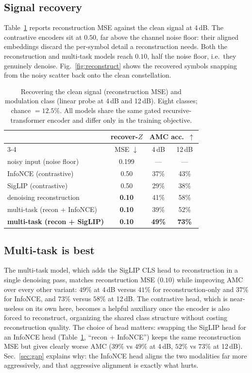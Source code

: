 \documentclass[conference]{IEEEtran}
\begin{document}
\subsection{Signal recovery}
Table~\ref{tab:recover} reports reconstruction MSE against the clean signal at
4\,dB. The contrastive encoders sit at $0.50$, far above the channel noise floor:
their aligned embeddings discard the per-symbol detail a reconstruction needs. Both
the reconstruction and multi-task models reach $0.10$, half the noise floor, i.e.\
they genuinely denoise. Fig.~\ref{fig:reconstruct} shows the recovered symbols
snapping from the noisy scatter back onto the clean constellation.

\begin{table}[t]
\centering
\caption{Recovering the clean signal (reconstruction MSE) and modulation class
(linear probe at 4\,dB and 12\,dB). Eight classes; chance $=12.5\%$. All models
share the same gated recursive-transformer encoder and differ only in the
training objective.}
\label{tab:recover}
\begin{tabular}{lccc}
\toprule
 & recover-$Z$ & \multicolumn{2}{c}{AMC acc.\ $\uparrow$} \\
\cmidrule(lr){3-4}
 & MSE $\downarrow$ & 4\,dB & 12\,dB \\
\midrule
noisy input (noise floor) & 0.199 & --- & --- \\
InfoNCE (contrastive) & 0.50 & 37\% & 43\% \\
SigLIP (contrastive) & 0.50 & 29\% & 38\% \\
denoising reconstruction & \textbf{0.10} & 41\% & 58\% \\
multi-task (recon + InfoNCE) & \textbf{0.10} & 39\% & 52\% \\
\textbf{multi-task (recon + SigLIP)} & \textbf{0.10} & \textbf{49\%} & \textbf{73\%} \\
\bottomrule
\end{tabular}
\end{table}

\subsection{Multi-task is best}
The multi-task model, which adds the SigLIP CLS head to reconstruction in a single
denoising pass, matches reconstruction MSE ($0.10$) while improving AMC over every
other variant: $49\%$ at 4\,dB versus $41\%$ for reconstruction-only and $37\%$ for
InfoNCE, and $73\%$ versus $58\%$ at 12\,dB. The contrastive head, which is
near-useless on its own here, becomes a helpful auxiliary once the encoder is also
forced to reconstruct, organizing the shared class structure without costing
reconstruction quality. The choice of head matters: swapping the SigLIP head for an
InfoNCE head (Table~\ref{tab:recover}, ``recon + InfoNCE'') keeps the same
reconstruction MSE but gives clearly worse AMC ($39\%$ vs $49\%$ at 4\,dB, $52\%$ vs
$73\%$ at 12\,dB). Sec.~\ref{sec:gap} explains why: the InfoNCE head aligns the two
modalities far more aggressively, and that aggressive alignment is exactly what hurts.
\end{document}
